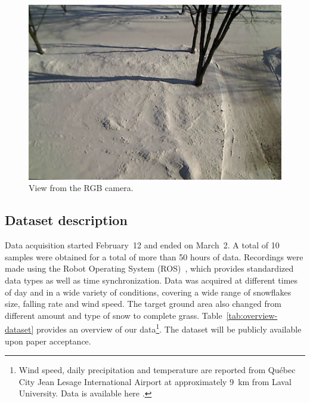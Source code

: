\begin{figure}[th]
    \centering
    \includegraphics[width=0.90\linewidth]{./img/camera_view.jpg}
    \caption{View from the RGB camera.}
    \label{fig:view}
\end{figure}

\subsection{Dataset description}
Data acquisition started February~12 and ended on March~2. A total of 10 samples were obtained for a total of more than 50 hours of data. Recordings were made using the Robot Operating System (ROS)~\cite{ROSWeb}, which provides standardized data types as well as time synchronization. Data was acquired at different times of day and in a wide variety of conditions, covering a wide range of snowflakes size, falling rate and wind speed. The target ground area also changed from different amount and type of snow to complete grass. Table~\ref{tab:overview-dataset} provides an overview of our data\footnote{Wind speed, daily precipitation and temperature are reported from Québec City Jean Lesage International Airport at approximately \SI{9}{\km} from Laval University. Data is available here \cite{WeatherCanada}.}. The dataset will be publicly available upon paper acceptance.

